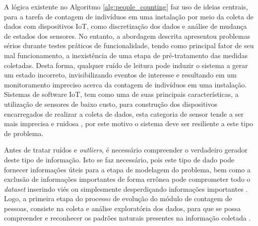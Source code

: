 A lógica existente no Algoritmo \ref{alg:people_counting} faz uso de ideias centrais, para a tarefa de contagem de indivíduos em uma instalação por meio da coleta de dados com dispositivos IoT, como discretização dos dados e análise de mudança de estados dos sensores. No entanto, a abordagem descrita apresentou problemas sérios durante testes práticos de funcionalidade, tendo como principal fator de seu mal funcionamento, a inexistência de uma etapa de pré-tratamento das medidas coletadas. Desta forma, qualquer ruído de leitura pode induzir o sistema a gerar um estado incorreto, invisibilizando eventos de interesse e resultando em um monitoramento impreciso acerca da contagem de indivíduos em uma instalação. Sistemas de software IoT, tem como uma de suas principais características, a utilização de sensores de baixo custo, para construção dos dispositivos encarregados de realizar a coleta de dados, esta categoria de sensor tende a ser mais imprecisa e ruidosa \cite{Komorowski2016}, por este motivo o sistema deve ser resiliente a este tipo de problema.

Antes de tratar ruídos e \textit{outliers}, é necessário compreender o verdadeiro gerador deste tipo de informação. Isto se faz necessário, pois este tipo de dado pode fornecer informações úteis para a etapa de modelagem do problema, bem como a exclusão de informações importantes de forma errônea pode comprometer todo o \textit{dataset} inserindo viés ou simplesmente desperdiçando informações importantes \cite{Komorowski2016}. Logo, a primeira etapa do processo de evolução do módulo de contagem de pessoas, consiste na coleta e análise exploratória dos dados, para que se possa compreender e reconhecer os padrões naturais presentes na informação coletada \cite{Komorowski2016}.


